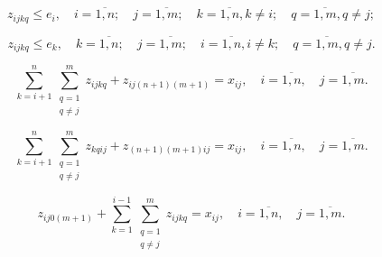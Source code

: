 
\begin{equation}
  \label{eq:part3_z_ijkq_1}
  z_{ijkq} \leq e_i , \quad i = \overline{1, n}; \quad j = \overline{1, m}; \quad k = \overline{1,n}, k \neq i; \quad q = \overline{1,m}, q \neq j;
\end{equation}


\begin{equation}
  \label{eq:part3_z_ijkq_2}
  z_{ijkq} \leq e_k , \quad k = \overline{1, n}; \quad j = \overline{1, m}; \quad i = \overline{1,n}, i \neq k; \quad q = \overline{1,m}, q \neq j.
\end{equation}



\begin{equation}
  \label{eq:part3_z_ijkq_1_1}
  \sum\limits_{k=i+1}^{n} \sum\limits_{\substack{q = 1\\ q \neq j}}^m z_{ijkq} + z_{ij(n+1)(m+1)} = x_{ij} ,  \quad i = \overline{1, n}, \quad j = \overline{1, m}.
\end{equation}

\begin{equation}
  \label{eq:part3_z_ijkq_1_2}
  \sum\limits_{k=i+1}^{n} \sum\limits_{\substack{q = 1\\ q \neq j}}^m z_{kqij} + z_{(n+1)(m+1)ij} = x_{ij} ,  \quad i = \overline{1, n}, \quad j = \overline{1, m}.
\end{equation}


\begin{equation}
  \label{eq:part3_z_ijkq_2_1}
  z_{ij0(m+1)} + \sum\limits_{k=1}^{i-1} \sum\limits_{\substack{q = 1\\ q \neq j}}^m z_{ijkq}= x_{ij}, \quad i = \overline{1, n}, \quad j = \overline{1, m}.
\end{equation}

